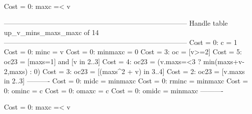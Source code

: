 Cost =  0:  maxc =< v

--------------------------------------------------------------------------------
Handle table up_v_mins_maxs_maxc of 14
--------------------------------------------------------------------------------
Cost =  0:  c       = 1
Cost =  0:  minc    = v
Cost =  0:  minmaxc = 0
Cost =  3:  oc      = [v>=2]
Cost =  5:  oc23    = [maxs=1] and [v in 2..3]
Cost =  4:  oc23    = (v.maxs=<3 ? min(maxs+v-2,maxs) : 0)
Cost =  3:  oc23    = [(maxs^2 + v) in 3..4]
Cost =  2:  oc23    = [v.maxs in 2..3]
----------
Cost =  0:  midc    = minmaxc
Cost =  0:  rminc   = minmaxc
Cost =  0:  ominc   = c
Cost =  0:  omaxc   = c
Cost =  0:  omidc   = minmaxc
----------

Cost =  0:  maxc =< v
